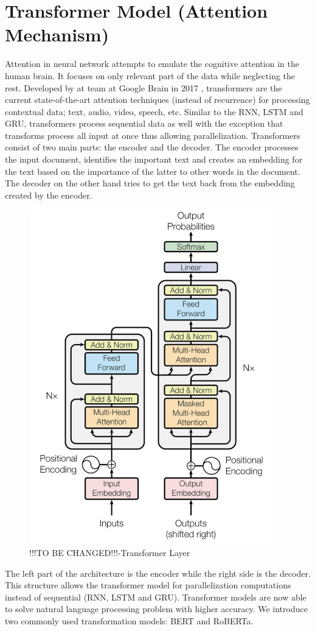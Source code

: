 \section{Transformer Model (Attention Mechanism)}
Attention in neural network attempts to emulate the cognitive attention in the human brain. It focuses on only relevant part of the data while neglecting the rest. Developed by at team at Google Brain in 2017 \cite{Vaswani2017}, transformers are the current state-of-the-art attention techniques (instead of recurrence) for processing contextual data; text, audio, video, speech, etc. Similar to the RNN, LSTM and GRU, transformers process sequential data as well with the exception that transforms process all input at once thus allowing parallelization. Transformers consist of two main parts: the encoder and the decoder. The encoder processes the input document, identifies the important text and creates an embedding for the text based on the importance of the latter to other words in the document. The decoder on the other hand tries to get the text back from the embedding created by the encoder.
\begin{figure}[H]
    \centering
    \includegraphics[scale=0.60]{CHAPTER_2/c2_fig_transformer_layer.png}
    \caption{!!!TO BE CHANGED!!!-Transformer Layer}
    \label{TRANSFORMER_LAYER}
  \end{figure}
The left part of the architecture is the encoder while the right side is the decoder. This structure allows the transformer model for parallelization computations instead of sequential (RNN, LSTM and GRU). Transformer models are now able to solve natural language processing problem with higher accuracy.  We introduce two commonly used transformation models: BERT and RoBERTa. 

